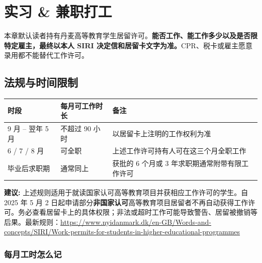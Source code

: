 \section{实习 \& 兼职打工}\label{sec:work}

本章默认读者持有丹麦高等教育学生居留许可。\textbf{能否工作、能工作多少以及是否限特定雇主，最终以本人 SIRI 决定信和居留卡文字为准。}CPR、税卡或雇主愿意录用都不能替代工作许可。

\subsection{法规与时间限制}

\begin{table}[H]
  \small
  \centering
  \setlength{\tabcolsep}{6pt}
  \label{tab:work-hours}
  \begin{tabularx}{\textwidth}{p{} p{} X}
    \toprule
    \textbf{时段} & \textbf{每月可工作时长} & \textbf{备注} \\
    \midrule
    9 月 – 翌年 5 月           & 不超过 90 小时 & 以居留卡上注明的工作权利为准 \\[2pt]
    6 / 7 / 8 月             & 可全职 & 上述工作许可持有人可在这三个月全职工作 \\[2pt]
    毕业后求职期 & 通常同上 & 获批的 6 个月或 3 年求职期通常附带有限工作许可 \\
    \bottomrule
  \end{tabularx}
\end{table}

\begin{grayleftbox}\textbf{建议: }
上述规则适用于就读国家认可高等教育项目并获相应工作许可的学生。自 2025 年 5 月 2 日起申请部分\textbf{非国家认可}高等教育项目居留者不再自动获得工作许可。务必查看居留卡上的具体权限；非法或超时工作可能导致警告、居留被撤销等后果。最新规则：\url{https://www.nyidanmark.dk/en-GB/Words-and-concepts/SIRI/Work-permits-for-students-in-higher-educational-programmes}
\end{grayleftbox}

\subsubsection{每月工时怎么记}

